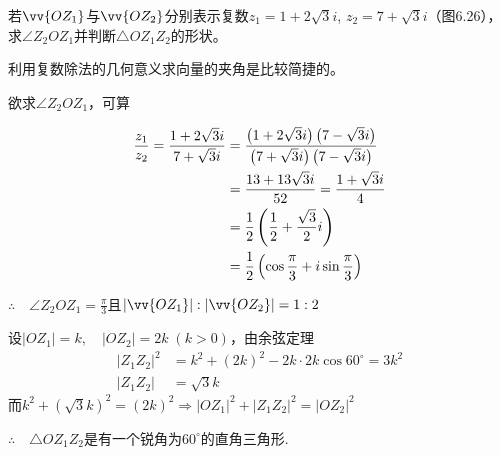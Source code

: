 \begin{example}
若$\vv{OZ_1}$与$\vv{OZ_2}$分别表示复数$z_1=1+2\sqrt{3}i$, $z_2=7+\sqrt{3}i$（图6.26），求$\angle Z_2OZ_1$并判断$\triangle OZ_1Z_2$的形状。
\end{example}

\begin{analyze}
    利用复数除法的几何意义求向量的夹角是比较简捷的。
\end{analyze}

\begin{solution}
欲求$\angle Z_2OZ_1$，可算  

\noindent
\begin{minipage}{.5\textwidth}
    \[\begin{split}
\dfrac{z_1}{z_2}=\dfrac{1+2\sqrt{3}i}{7+\sqrt{3}i}&=\dfrac{\left(1+2\sqrt{3}i\right)\left(7-\sqrt{3}i\right)}{\left(7+\sqrt{3}i\right)\left(7-\sqrt{3}i\right)}\\
&=\dfrac{13+13\sqrt{3}i}{52}=\dfrac{1+\sqrt{3}i}{4}\\
&=\dfrac{1}{2}\left(\dfrac{1}{2}+\dfrac{\sqrt{3}}{2}i\right)\\
&=\dfrac{1}{2}\left(\cos\dfrac{\pi}{3}+i\sin\dfrac{\pi}{3}\right)
\end{split}\]
\end{minipage}\hfill
\begin{minipage}{.45\textwidth}
\centering
{}
\end{minipage}

$\therefore\quad \angle Z_2OZ_1=\frac{\pi}{3}$且$|\vv{OZ_1}|:|\vv{OZ_2}|=1:2$

设$|{OZ_1}|=k,\quad |OZ_2|=2k\; (k>0)$，由余弦定理
\[\begin{split}
    |Z_1Z_2|^2&=k^2+(2k)^2-2k\cdot 2k\cos60^{\circ}=3k^2\\
    |Z_1Z_2|&=\sqrt{3}k
\end{split}\]
而$k^2+\left(\sqrt{3}k\right)^2=(2k)^2 \Rightarrow |OZ_1|^2+|Z_1Z_2|^2=|OZ_2|^2$

$\therefore\quad \triangle OZ_1Z_2$是有一个锐角为$60^{\circ}$的直角三角形.
\end{solution}



